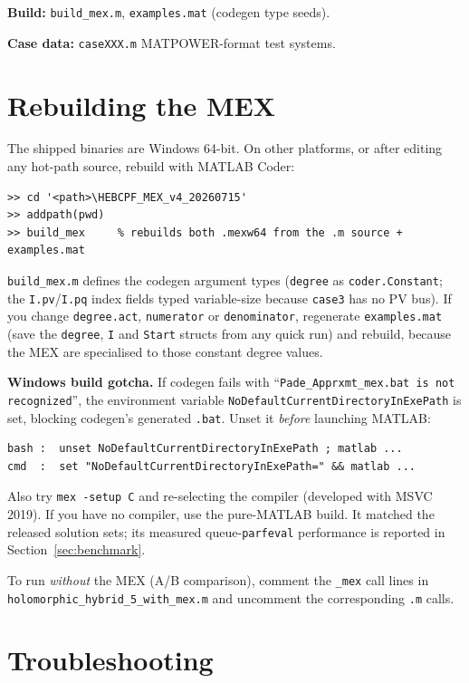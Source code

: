 \documentclass[11pt,a4paper]{article}
\newcommand{\code}[1]{\texttt{#1}}
\begin{document}
\textbf{Build:} \code{build_mex.m}, \code{examples.mat} (codegen type seeds).

\textbf{Case data:} \code{caseXXX.m} MATPOWER-format test systems.

\section{Rebuilding the MEX}\label{sec:mex}

The shipped binaries are Windows 64-bit. On other platforms, or after editing any
hot-path source, rebuild with MATLAB Coder:
\begin{lstlisting}[style=mat]
>> cd '<path>\HEBCPF_MEX_v4_20260715'
>> addpath(pwd)
>> build_mex     % rebuilds both .mexw64 from the .m source + examples.mat
\end{lstlisting}
\code{build_mex.m} defines the codegen argument types (\code{degree} as
\code{coder.Constant}; the \code{I.pv}/\code{I.pq} index fields typed variable-size
because \code{case3} has no PV bus). If you change \code{degree.act}, \code{numerator} or
\code{denominator}, regenerate \code{examples.mat} (save the \code{degree}, \code{I} and
\code{Start} structs from any quick run) and rebuild, because the MEX are specialised to
those constant degree values.

\textbf{Windows build gotcha.} If codegen fails with
``\code{Pade_Apprxmt_mex.bat is not recognized}'', the environment variable
\code{NoDefaultCurrentDirectoryInExePath} is set, blocking codegen's generated \code{.bat}.
Unset it \emph{before} launching MATLAB:
\begin{lstlisting}[style=sh]
bash :  unset NoDefaultCurrentDirectoryInExePath ; matlab ...
cmd  :  set "NoDefaultCurrentDirectoryInExePath=" && matlab ...
\end{lstlisting}
Also try \code{mex -setup C} and re-selecting the compiler (developed with MSVC 2019). If
you have no compiler, use the pure-MATLAB build. It matched the released solution sets;
its measured queue-\code{parfeval} performance is reported in Section~\ref{sec:benchmark}.

To run \emph{without} the MEX (A/B comparison), comment the \code{_mex} call lines in
\code{holomorphic_hybrid_5_with_mex.m} and uncomment the corresponding \code{.m} calls.

\section{Troubleshooting}
\end{document}
